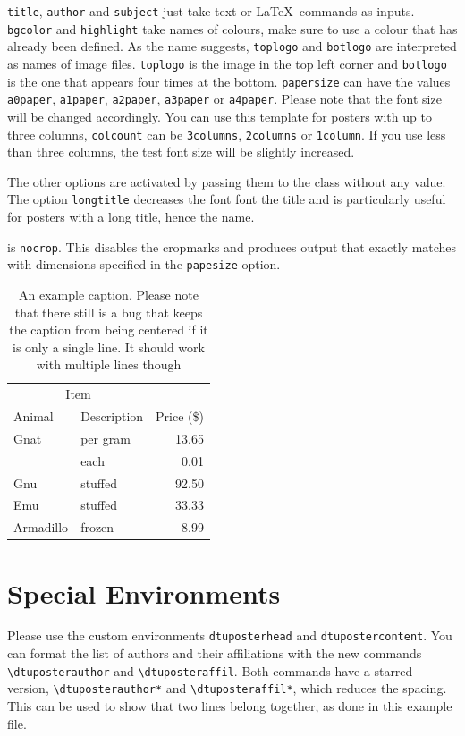 \documentclass[
]{dtuposter}
\begin{document}
\begin{dtupostercontent}
\texttt{title}, \texttt{author} and \texttt{subject} just take text or
\LaTeX\ commands as inputs. \texttt{bgcolor} and \texttt{highlight} take 
names of colours, make sure to use a colour that has already been defined.
As the name suggests, \texttt{toplogo} and \texttt{botlogo} are interpreted
as names of image files. \texttt{toplogo} is the image in the top left 
corner and \texttt{botlogo} is the one that appears four times at the bottom.
\texttt{papersize} can have the values \texttt{a0paper}, \texttt{a1paper}, 
\texttt{a2paper}, \texttt{a3paper} or \texttt{a4paper}. Please note that the 
font size will be changed accordingly. You can use this template for posters
with up to three columns, \texttt{colcount} can be \texttt{3columns}, 
\texttt{2columns} or \texttt{1column}. If you use less than three columns, 
the test font size will be slightly increased.

The other options are activated by passing them to the class without any value.
The option \texttt{longtitle} decreases the font font the title and is 
particularly useful for posters with a long title, hence the name. 

is \texttt{nocrop}. This disables the cropmarks and produces output that 
exactly matches with dimensions specified in the \texttt{papesize} option. 

\begin{table}
\caption{An example caption. Please note that there still is a bug that keeps the 
caption from being centered if it is only a single line. It should work with multiple
lines though}\label{tab:example}

\begin{tabular}{llr}
\toprule
\multicolumn{2}{c}{Item} \\
\cmidrule(r){1-2}
Animal    & Description & Price (\$) \\
\midrule
Gnat      & per gram    & 13.65      \\
          & each        & 0.01       \\
Gnu       & stuffed     & 92.50      \\
Emu       & stuffed     & 33.33      \\
Armadillo & frozen      & 8.99       \\
\bottomrule
\end{tabular}
\end{table}

\section{Special Environments}
Please use the custom environments \texttt{dtuposterhead} and 
\texttt{dtupostercontent}. You can format the list of authors and 
their affiliations with the new commands \texttt{\textbackslash dtuposterauthor}
and \texttt{\textbackslash dtuposteraffil}. Both commands have a starred version, 
\texttt{\textbackslash dtuposterauthor*} and \texttt{\textbackslash dtuposteraffil*}, 
which reduces the spacing. This can be used to show that two lines belong together, as
done in this example file.


\end{dtupostercontent}
\end{document}
